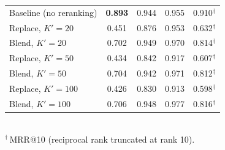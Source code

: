 \begin{table}[ht]
{\begin{tabular}{lcccc}
\quad Baseline (no reranking) & \textbf{0.893} & 0.944 & 0.955 & 0.910$^{\dagger}$ \\
\quad Replace, $K'=20$ & 0.451 & 0.876 & 0.953 & 0.632$^{\dagger}$ \\
\quad Blend, $K'=20$ & 0.702 & 0.949 & 0.970 & 0.814$^{\dagger}$ \\
\quad Replace, $K'=50$ & 0.434 & 0.842 & 0.917 & 0.607$^{\dagger}$ \\
\quad Blend, $K'=50$ & 0.704 & 0.942 & 0.971 & 0.812$^{\dagger}$ \\
\quad Replace, $K'=100$ & 0.426 & 0.830 & 0.913 & 0.598$^{\dagger}$ \\
\quad Blend, $K'=100$ & 0.706 & 0.948 & 0.977 & 0.816$^{\dagger}$ \\
\bottomrule
\end{tabular}
}
\\[2pt]{\footnotesize $^{\dagger}$\,MRR@10 (reciprocal rank truncated at rank 10).}
\end{table}

